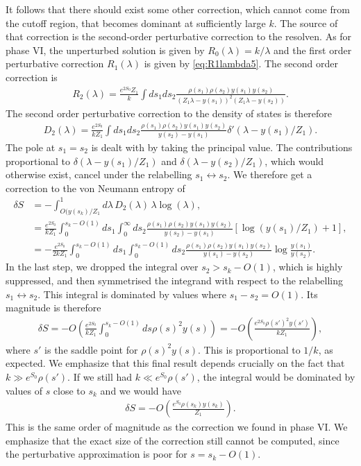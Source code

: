 \documentclass[11pt]{article}
\newcommand{\smax}{s_k}
\newcommand{\sprime}{s'}
\numberwithin{equation}{section}
\begin{document}
It follows that there should exist some other correction, which cannot come from the cutoff region, that becomes dominant at sufficiently large $k$. The source of that correction is the second-order perturbative correction to the resolven. As for phase VI, the unperturbed solution is given by $R_0(\lambda) = k/ \lambda$ and the first order perturbative correction $R_1(\lambda)$ is given by \eqref{eq:R1lambda5}. The second order correction is
\begin{align}
R_2 (\lambda) =\frac{e^{2S_0} Z_1}{k} \int ds_1 ds_2 \frac{\rho(s_1) \rho(s_2) y(s_1) y(s_2)}{(Z_1 \lambda - y(s_1))^2 (Z_1 \lambda - y(s_2))}.
\end{align}
The second order perturbative correction to the density of states is therefore
\begin{align}
D_2 (\lambda) = \frac{e^{2S_0}}{k Z_1} \int ds_1 ds_2 \frac{\rho(s_1) \rho(s_2) y(s_1) y(s_2)}{y(s_2) - y(s_1)} \delta'(\lambda - y(s_1) / Z_1).
\end{align}
The pole at $s_1 = s_2$ is dealt with by taking the principal value. The contributions proportional to $\delta(\lambda - y(s_1) / Z_1)$ and $\delta(\lambda - y(s_2) / Z_1)$, which would otherwise exist, cancel under the relabelling $s_1 \leftrightarrow s_2$. We therefore get a correction to the von Neumann entropy of
\begin{align}
\delta S &=  - \int^1_{O(y(\smax)/Z_1} d \lambda\, D_2(\lambda) \,\lambda \log(\lambda),
\\& = \frac{e^{2S_0}}{k Z_1} \int_0^{\smax - O(1)} ds_1 \int_0^\infty ds_2 \frac{\rho(s_1) \rho(s_2) y(s_1) y(s_2)}{y(s_2) - y(s_1)} [\log(y(s_1)/Z_1) + 1],
\\& = -\frac{e^{2S_0}}{2 k Z_1} \int_0^{\smax - O(1)} ds_1 \int_0^{\smax - O(1)} ds_2 \frac{\rho(s_1) \rho(s_2) y(s_1) y(s_2)}{y(s_1) - y(s_2)} \log\frac{y(s_1)}{y(s_2)}. \label{eq:vNcorrectionlargeK}
\end{align}
In the last step, we dropped the integral over $s_2 > \smax - O(1)$, which is highly suppressed, and then symmetrised the integrand with respect to the relabelling $s_1 \leftrightarrow s_2$. This integral is dominated by values where $s_1 - s_2 = O(1)$. Its magnitude is therefore
\begin{align}
\delta S = - O\left(\frac{e^{2S_0}}{k Z_1} \int_0^{\smax - O(1)} ds \rho(s)^2 y(s)\right) = -O\left(\frac{e^{2S_0} \rho(\sprime)^2 y(\sprime)}{k Z_1}\right),
\end{align}
where $\sprime$ is the saddle point for $\rho(s)^2 y(s)$. This is proportional to $1/k$, as expected. We emphasize that this final result depends crucially on the fact that $k \gg e^{S_0}\rho(\sprime)$. If we still had $k \ll e^{S_0}\rho(\sprime)$, the integral would be dominated by values of $s$ close to $\smax$ and we would have 
\begin{align}
\delta S =  -O\left(\frac{e^{S_0} \rho(\smax) y(\smax)}{ Z_1}\right).
\end{align}
 This is the same order of magnitude as the correction we found in phase VI. We emphasize that the exact size of the correction still cannot be computed, since the perturbative approximation is poor for $s = \smax- O(1)$.
\end{document}
